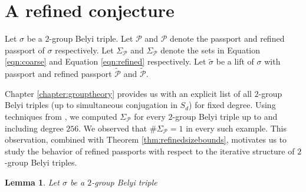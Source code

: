 \documentclass{dcthesis}
\newcommand{\ZZ}{\mathbb Z}
\newcommand{\wt}[1]{\widetilde{#1}}
\numberwithin{equation}{section}
\newtheorem{lemma}[equation]{Lemma}
\theoremstyle{definition}
\theoremstyle{remark}
\begin{document}
{  \section{A refined conjecture}{\label{sec:conjecture}}{
    Let $\sigma$ be a $2$-group Belyi triple.
    Let $\mathcal{P}$ and $\mathscr{P}$ denote the
    passport and refined passport of $\sigma$
    respectively.
    Let $\Sigma_\mathcal{P}$ and $\Sigma_\mathscr{P}$
    denote the sets in
    Equation \ref{eqn:coarse}
    and
    Equation \ref{eqn:refined}
    respectively.
    Let $\wt{\sigma}$ be a lift of $\sigma$
    with passport and refined passport
    $\wt{\mathcal{P}}$ and $\wt{\mathscr{P}}$.
    \par
    Chapter \ref{chapter:grouptheory}
    provides us with an explicit list
    of all $2$-group Belyi triples
    (up to simultaneous conjugation in $S_d$)
    for fixed degree.
    Using techniques from
    \cite{belyidb},
    we computed $\Sigma_\mathscr{P}$ for
    every $2$-group Belyi triple
    up to and including degree $256$.
    We observed that
    $\#\Sigma_\mathscr{P}=1$
    in every such example.
    This observation,
    combined with Theorem \ref{thm:refinedsizebounds},
    motivates us to study the behavior
    of refined passports with respect
    to the iterative structure of
    $2$-group Belyi triples.
    \begin{lemma}
      \label{lem:coarsetorefined}
      Let $\sigma$ be a $2$-group Belyi triple

\end{lemma}}}
\end{document}
